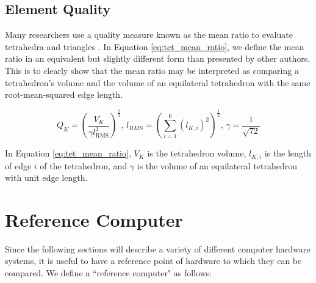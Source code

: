 \subsection{Element Quality}
\label{sec:def_quality}

Many researchers use a quality measure known as the mean ratio
to evaluate tetrahedra and triangles
\cite{liu1994relationship,loseille2015parallel,compere2010mesh,
li20053d}.
In Equation \ref{eq:tet_mean_ratio}, we define the mean ratio
in an equivalent but slightly different form than presented by other
authors.
This is to clearly show that the mean ratio may be interpreted
as comparing a tetrahedron's volume and the volume of
an equilateral tetrahedron with the same root-mean-squared edge length.

\begin{equation} \label{eq:tet_mean_ratio}
Q_K = \left(\frac{V_K}{\gamma l_{\text{RMS}}^3}\right)^{\frac23},\,
l_{RMS}=\left(\sum_{i=1}^6 \left(l_{K,i}\right)^2\right)^\frac12, \,
\gamma = \frac{1}{\sqrt{72}}
\end{equation}

In Equation \ref{eq:tet_mean_ratio},
$V_K$ is the tetrahedron volume, $l_{K,i}$ is the
length of edge $i$ of the tetrahedron, and $\gamma$ is the volume
of an equilateral tetrahedron with unit edge length.

\section{Reference Computer}
\label{sec:ref_comp}

Since the following sections will describe a variety
of different computer hardware systems, it is useful to have a reference
point of hardware to which they can be compared.
We define a ``reference computer" as follows:

